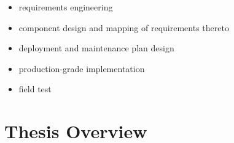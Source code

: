 \begin{itemize}
  \item requirements engineering
  \item component design and mapping of requirements thereto
  \item deployment and maintenance plan design
  \item production-grade implementation
  \item field test
\end{itemize}

\section{Thesis Overview}
\label{sec:thesis-overview}
